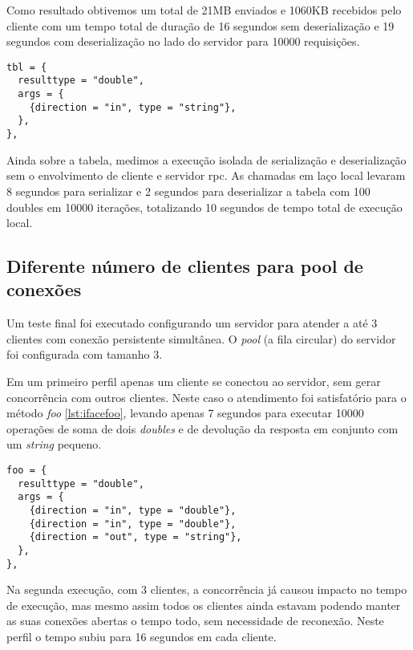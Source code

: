 \documentclass[11pt]{article}
\begin{document}
Como resultado obtivemos um total de 21MB enviados e 1060KB recebidos pelo
cliente com um tempo total de duração de 16 segundos sem deserialização e 19
segundos com deserialização no lado do servidor para 10000 requisições.

\begin{lstlisting}[caption={Interface tbl},label={lst:ifacetbl}]
tbl = {
  resulttype = "double",
  args = {
    {direction = "in", type = "string"},
  },
},
\end{lstlisting}

Ainda sobre a tabela, medimos a execução isolada de serialização e
deserialização sem o envolvimento de cliente e servidor \gls{rpc}. As chamadas
em laço local levaram 8 segundos para serializar e 2 segundos para deserializar
a tabela com 100 doubles em 10000 iterações, totalizando 10 segundos de tempo
total de execução local.

\subsection{Diferente número de clientes para pool de conexões}\label{subsec:diffpool}

Um teste final foi executado configurando um servidor para atender a até 3
clientes com conexão persistente simultânea. O \textit{pool} (a fila circular)
do servidor foi configurada com tamanho 3.

Em um primeiro perfil apenas um cliente se conectou ao servidor, sem gerar
concorrência com outros clientes. Neste caso o atendimento foi satisfatório para
o método \textit{foo} \ref{lst:ifacefoo}, levando apenas 7 segundos para executar
10000 operações de soma de dois \textit{doubles} e de devolução da resposta em
conjunto com um \textit{string} pequeno.

\begin{lstlisting}[caption={Interface foo},label={lst:ifacefoo}]
foo = {
  resulttype = "double",
  args = {
    {direction = "in", type = "double"},
    {direction = "in", type = "double"},
    {direction = "out", type = "string"},
  },
},
\end{lstlisting}

Na segunda execução, com 3 clientes, a concorrência já causou impacto no tempo
de execução, mas mesmo assim todos os clientes ainda estavam podendo manter as
suas conexões abertas o tempo todo, sem necessidade de reconexão. Neste perfil o
tempo subiu para 16 segundos em cada cliente.
\end{document}

